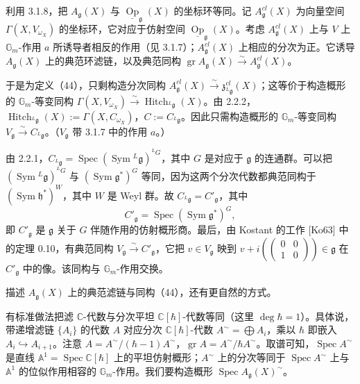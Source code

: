  利用 3.1.8，把 $A_{\mathfrak{g}}(X)$ 与 $\underline{\operatorname{Op}}_{\mathfrak{g}}(X)$ 的坐标环等同。记 $A^{cl}_{\mathfrak{g}}(X)$ 为向量空间 $\Gamma(X,V_{\omega_X})$ 的坐标环，它对应于仿射空间 $\underline{\operatorname{Op}}_{\mathfrak{g}}(X)$。考虑 $A^{cl}_{\mathfrak{g}}(X)$ 上与 $V$ 上 $\mathbb{G}_m$-作用 $a$ 所诱导者相反的作用（见 3.1.7）；$A^{cl}_{\mathfrak{g}}(X)$ 上相应的分次为正。它诱导 $A_{\mathfrak{g}}(X)$ 上的典范环滤链，以及典范同构 $\operatorname{gr} A_{\mathfrak{g}}(X) \xrightarrow{\sim} A^{cl}_{\mathfrak{g}}(X)$。

于是为定义（44），只剩构造分次同构 $A^{cl}_{\mathfrak{g}}(X) \xrightarrow{\sim} \mathfrak{z}^{cl}_{{}^{L}\mathfrak{g}}(X)$；这等价于构造概形的 $\mathbb{G}_m$-等变同构 $\Gamma(X,V_{\omega_X}) \xrightarrow{\sim} \operatorname{Hitch}_{{}^{L}\mathfrak{g}}(X)$。由 2.2.2，$\operatorname{Hitch}_{{}^{L}\mathfrak{g}}(X) := \Gamma(X,C_{\omega_X})$，$C := C_{{}^{L}\mathfrak{g}}$。因此只需构造概形的 $\mathbb{G}_m$-等变同构 $V_{\mathfrak{g}} \xrightarrow{\sim} C_{{}^{L}\mathfrak{g}}$。（$V_{\mathfrak{g}}$ 带 3.1.7 中的作用 $a$。）


由 2.2.1，$C_{{}^{L}\mathfrak{g}} = \operatorname{Spec}(\operatorname{Sym}{}^{L}\mathfrak{g})^{{}^{L}G}$，其中 $G$ 是对应于 $\mathfrak{g}$ 的连通群。可以把 $(\operatorname{Sym}{}^{L}\mathfrak{g})^{{}^{L}G}$ 与 $(\operatorname{Sym}\mathfrak{g}^*)^G$ 等同，因为这两个分次代数都典范同构于 $(\operatorname{Sym}\mathfrak{h}^*)^W$，其中 $W$ 是 Weyl 群。故 $C_{{}^{L}\mathfrak{g}} = C'_{\mathfrak{g}}$，其中
\begin{equation}\tag{45}
C'_{\mathfrak{g}} = \operatorname{Spec}(\operatorname{Sym}\mathfrak{g}^*)^G,
\end{equation}
即 $C'_{\mathfrak{g}}$ 是 $\mathfrak{g}$ 关于 $G$ 伴随作用的仿射概形商。最后，由 Kostant 的工作 [Ko63] 中的定理 0.10，有典范同构 $V_{\mathfrak{g}} \xrightarrow{\sim} C'_{\mathfrak{g}}$，它把 $v \in V_{\mathfrak{g}}$ 映到 $v + i\left(\begin{pmatrix}0&0\\1&0\end{pmatrix}\right) \in \mathfrak{g}$ 在 $C'_{\mathfrak{g}}$ 中的像。该同构与 $\mathbb{G}_m$-作用交换。

 描述 $A_{\mathfrak{g}}(X)$ 上的典范滤链与同构（44），还有更自然的方式。

有标准做法把滤 $\mathbb{C}$-代数与分次平坦 $\mathbb{C}[\hbar]$-代数等同（这里 $\deg\hbar = 1$）。具体说，带递增滤链 $\{A_i\}$ 的代数 $A$ 对应分次 $\mathbb{C}[\hbar]$-代数 $A^{\sim} = \bigoplus A_i$，乘以 $\hbar$ 即嵌入 $A_i \hookrightarrow A_{i+1}$。注意 $A = A^{\sim}/(\hbar-1)A^{\sim}$，$\operatorname{gr} A = A^{\sim}/\hbar A^{\sim}$。取谱可知，$\operatorname{Spec} A^{\sim}$ 是直线 $\mathbb{A}^1 = \operatorname{Spec}\mathbb{C}[\hbar]$ 上的平坦仿射概形；$A^{\sim}$ 上的分次等同于 $\operatorname{Spec} A^{\sim}$ 上与 $\mathbb{A}^1$ 的位似作用相容的 $\mathbb{G}_m$-作用。我们要构造概形 $\operatorname{Spec} A_{\mathfrak{g}}(X)^{\sim}$。

